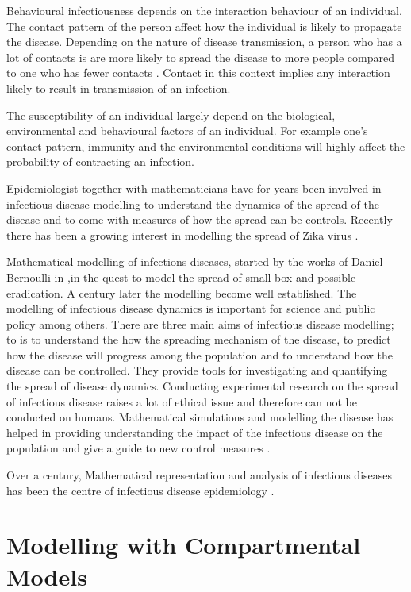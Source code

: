 Behavioural infectiousness depends on the interaction behaviour of an individual. The contact pattern of the person affect how the individual is likely to propagate   the disease. Depending on the nature of disease transmission, a person who has  a lot of contacts is are more likely to spread the disease to more people compared to one who has fewer contacts \citep{johnson2001sexual}. Contact in this context implies any interaction likely to result in transmission of an infection.

The susceptibility of an individual largely depend on the biological, environmental and behavioural factors of an individual. For example one's contact pattern, immunity and the environmental conditions will highly affect the probability of contracting an infection.

Epidemiologist together with mathematicians have for years been involved in infectious disease modelling to understand the dynamics of the spread of the disease and to come with measures of how the spread can be controls. Recently there has been a growing interest in modelling the spread of Zika virus \citep{ku2016}.

Mathematical modelling of infections diseases, started by the works of Daniel Bernoulli in \cite{bernoulli1760essai},in the quest to model the spread of small box and possible eradication. A century later the modelling become well established. The modelling of infectious disease dynamics is important for science and public policy among others. There are three main aims of infectious disease modelling; to is to understand the how the spreading mechanism of the disease, to  predict how the disease will progress among the population and to understand how the disease can be controlled. They provide tools for investigating and quantifying the spread of disease dynamics. Conducting experimental research on the spread of infectious disease raises a lot of ethical issue and therefore can not be conducted on humans. Mathematical simulations and modelling the disease has helped in providing understanding the impact of the infectious disease on the population and give a guide to new control measures \citep{ming2016stochastic}.

Over a  century, Mathematical representation and analysis of infectious diseases has been the centre of  infectious disease epidemiology \citep{b2005}.

\section{Modelling with Compartmental Models}

